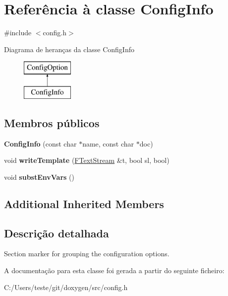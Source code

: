 \hypertarget{class_config_info}{\section{Referência à classe Config\-Info}
\label{class_config_info}
}


{\ttfamily \#include $<$config.\-h$>$}

Diagrama de heranças da classe Config\-Info\begin{figure}[H]
\begin{center}
\leavevmode
\includegraphics[height=2.000000cm]{class_config_info}
\end{center}
\end{figure}
\subsection*{Membros públicos}
\begin{DoxyCompactItemize}
\item 
\hypertarget{class_config_info_a6687fc30bb61fbadaa3bedfbbecf053f}{{\bfseries Config\-Info} (const char $\ast$name, const char $\ast$doc)}\label{class_config_info_a6687fc30bb61fbadaa3bedfbbecf053f}

\item 
\hypertarget{class_config_info_ad532b92c9971149d194403dff3458ba7}{void {\bfseries write\-Template} (\hyperlink{class_f_text_stream}{F\-Text\-Stream} \&t, bool sl, bool)}\label{class_config_info_ad532b92c9971149d194403dff3458ba7}

\item 
\hypertarget{class_config_info_a79866440425087f224d4f77311efad6a}{void {\bfseries subst\-Env\-Vars} ()}\label{class_config_info_a79866440425087f224d4f77311efad6a}

\end{DoxyCompactItemize}
\subsection*{Additional Inherited Members}


\subsection{Descrição detalhada}
Section marker for grouping the configuration options. 

A documentação para esta classe foi gerada a partir do seguinte ficheiro\-:\begin{DoxyCompactItemize}
\item 
C\-:/\-Users/teste/git/doxygen/src/config.\-h\end{DoxyCompactItemize}
